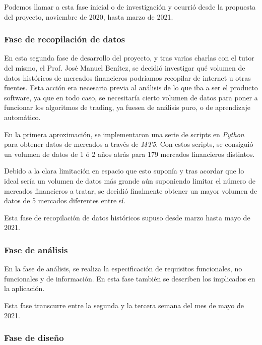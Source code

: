 Podemos llamar a esta fase inicial o de investigación y ocurrió desde la propuesta del proyecto, noviembre de 2020, hasta marzo de 2021. \newline


\subsubsection{Fase de recopilación de datos}

En esta segunda fase de desarrollo del proyecto, y tras varias charlas con el tutor del mismo, el Prof. José Manuel Benítez, se decidió investigar qué volumen de datos históricos de mercados financieros podríamos recopilar de internet u otras fuentes. Esta acción era necesaria previa al análisis de lo que iba a ser el producto software, ya que en todo caso, se necesitaría cierto volumen de datos para poner a funcionar los algoritmos de trading, ya fuesen de análisis puro, o de aprendizaje automático. \newline

En la primera aproximación, se implementaron una serie de scripts en \textit{Python} para obtener datos de mercados a través de \textit{MT5}. Con estos scripts, se consiguió un volumen de datos de 1 ó 2 años atrás para 179 mercados financieros distintos. \newline

Debido a la clara limitación en espacio que esto suponía y tras acordar que lo ideal sería un volumen de datos más grande aún suponiendo limitar el número de mercados financieros a tratar, se decidió finalmente obtener un mayor volumen de datos de 5 mercados diferentes entre sí. \newline

Esta fase de recopilación de datos históricos supuso desde marzo hasta mayo de 2021.

\subsubsection{Fase de análisis}

En la fase de análisis, se realiza la especificación de requisitos funcionales, no funcionales y de información. En esta fase también se describen los implicados en la aplicación. \newline

Esta fase transcurre entre la segunda y la tercera semana del mes de mayo de 2021.

\subsubsection{Fase de diseño}

